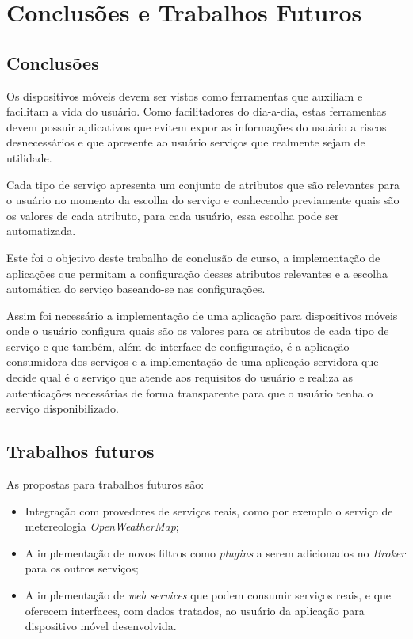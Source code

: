 \chapter{Conclusões e Trabalhos Futuros}\label{cha:conclusao}

\section{Conclusões}
Os dispositivos móveis devem ser vistos como ferramentas que auxiliam e facilitam a vida do usuário. Como facilitadores do dia-a-dia, estas ferramentas devem possuir aplicativos que evitem expor as informações do usuário a riscos desnecessários e que apresente ao usuário serviços que realmente sejam de utilidade.

Cada tipo de serviço apresenta um conjunto de atributos que são relevantes para o usuário no momento da escolha do serviço e conhecendo previamente quais são os valores de cada atributo, para cada usuário, essa escolha pode ser automatizada.

Este foi o objetivo deste trabalho de conclusão de curso, a implementação de aplicações que permitam a configuração desses atributos relevantes e a escolha automática do serviço baseando-se nas configurações.

Assim foi necessário a implementação de uma aplicação para dispositivos móveis onde o usuário configura quais são os valores para os atributos de cada tipo de serviço e que também, além de interface de configuração, é a aplicação consumidora dos serviços e a implementação de uma aplicação servidora que decide qual é o serviço que atende aos requisitos do usuário e realiza as autenticações necessárias de forma transparente para que o usuário tenha o serviço disponibilizado.

\section{Trabalhos futuros}
As propostas para trabalhos futuros são:
\begin{itemize}
	\item Integração com provedores de serviços reais, como por exemplo o serviço de metereologia \textit{OpenWeatherMap};
	\item A implementação de novos filtros como \textit{plugins} a serem adicionados no \textit{Broker} para os outros serviços;
	\item A implementação de \textit{web services} que podem consumir serviços reais, e que oferecem interfaces, com dados tratados, ao usuário da aplicação para dispositivo móvel desenvolvida.
\end{itemize}